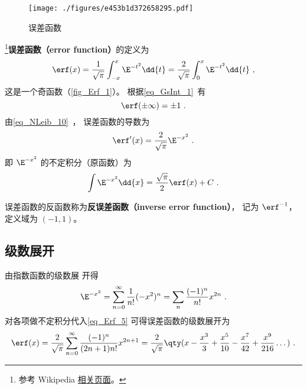 

\begin{figure}[ht]
\centering
\texttt{[image: ./figures/e453b1d372658295.pdf]}
\caption{误差函数} \label{fig_Erf_1}
\end{figure}

\footnote{参考 Wikipedia \href{https://en.wikipedia.org/wiki/Error_function}{相关页面}。}\textbf{误差函数（error function）}的定义为
\begin{equation}\label{eq_Erf_1}
\erf(x) = \frac{1}{\sqrt{\pi}} \int_{-x}^x \E^{-t^2} \dd{t}
= \frac{2}{\sqrt{\pi}} \int_{0}^x \E^{-t^2} \dd{t}~,
\end{equation}
这是一个奇函数（\autoref{fig_Erf_1}）。 根据\autoref{eq_GsInt_1}~有
\begin{equation}
\erf(\pm\infty) = \pm 1~.
\end{equation}
由\autoref{eq_NLeib_10}~， 误差函数的导数为
\begin{equation} %
\erf'(x) = \frac{2}{\sqrt{\pi}} \E^{-x^2}~.
\end{equation}
即 $\E^{-x^2}$ 的不定积分（原函数）为
\begin{equation}\label{eq_Erf_5}
\int \E^{-x^2} \dd{x} = \frac{\sqrt{\pi}}{2} \erf(x) + C~.
\end{equation}

误差函数的反函数称为\textbf{反误差函数（inverse error function）}， 记为 $\erf^{-1}$， 定义域为 $(-1,1)$。

\subsection{级数展开}
由指数函数的级数展%
开得
\begin{equation}
\E^{-x^2} = \sum_{n=0}^\infty \frac{1}{n!} (-x^2)^n = \sum_n \frac{(-1)^n}{n!} x^{2n}~.
\end{equation}
对各项做不定积分代入\autoref{eq_Erf_5} 可得误差函数的级数展开为
\begin{equation}
\erf(x) = \frac{2}{\sqrt{\pi}} \sum_{n=0}^\infty \frac{(-1)^n}{(2n+1)n!} x^{2n+1}
= \frac{2}{\sqrt{\pi}}\qty(x - \frac{x^3}{3} + \frac{x^5}{10} - \frac{x^7}{42} + \frac{x^9}{216} \dots)~.
\end{equation}

